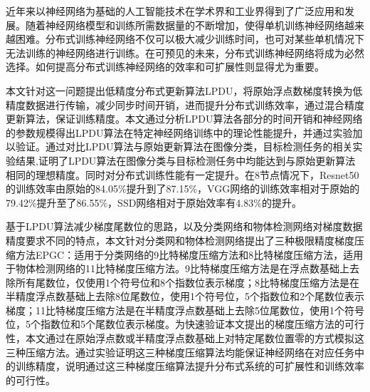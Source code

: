 \begin{cabstract}
近年来以神经网络为基础的人工智能技术在学术界和工业界得到了广泛应用和发展。随着神经网络模型和训练所需数据量的不断增加，使得单机训练神经网络越来越困难。分布式训练神经网络不仅可以极大减少训练时间，也可对某些单机情况下无法训练的神经网络进行训练。在可预见的未来，分布式训练神经网络将成为必然选择。如何提高分布式训练神经网络的效率和可扩展性则显得尤为重要。

本文针对这一问题提出低精度分布式更新算法LPDU，将原始浮点数梯度转换为低精度数据进行传输，减少同步时间开销，进而提升分布式训练效率，通过混合精度更新算法，保证训练精度。本文通过分析LPDU算法各部分的时间开销和神经网络的参数规模得出LPDU算法在特定神经网络训练中的理论性能提升，并通过实验加以验证。通过对比LPDU算法与原始更新算法在图像分类，目标检测任务的相关实验结果,证明了LPDU算法在图像分类与目标检测任务中均能达到与原始更新算法相同的理想精度。同时对分布式训练性能有一定提升。在8节点情况下，Resnet50的训练效率由原始的84.05\%提升到了87.15\%，VGG网络的训练效率相对于原始的79.42\%提升至了86.55\%，SSD网络相对于原始效率有4.83\%的提升。

基于LPDU算法减少梯度尾数位的思路，以及分类网络和物体检测网络对梯度数据精度要求不同的特点，本文针对分类网和物体检测网络提出了三种极限精度梯度压缩方法EPGC：适用于分类网络的9比特梯度压缩方法和8比特梯度压缩方法，适用于物体检测网络的11比特梯度压缩方法。9比特梯度压缩方法是在浮点数基础上去除所有尾数位，仅使用1个符号位和8个指数位表示梯度；8比特梯度压缩方法是在半精度浮点数基础上去除8位尾数位，使用1个符号位，5个指数位和2个尾数位表示梯度；11比特梯度压缩方法是在半精度浮点数基础上去除5位尾数位，使用1个符号位，5个指数位和5个尾数位表示梯度。为快速验证本文提出的梯度压缩方法的可行性，本文通过在原始浮点数或半精度浮点数基础上对特定尾数位置零的方式模拟这三种压缩方法。通过实验证明这三种梯度压缩算法均能保证神经网络在对应任务中的训练精度，说明通过这三种梯度压缩算法提升分布式系统的可扩展性和训练效率的可行性。

\end{cabstract}

